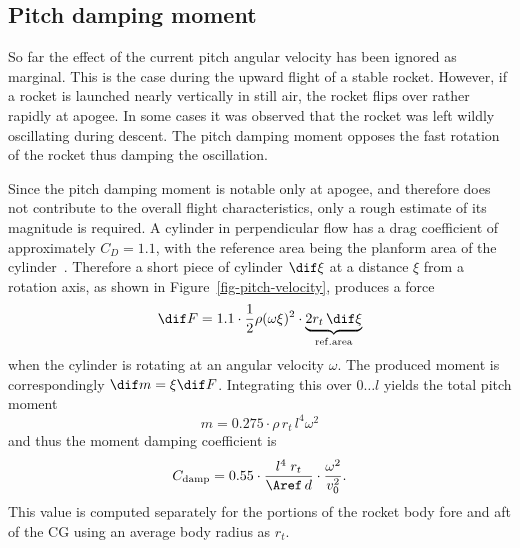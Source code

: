 



\pagebreak[4]
\subsection{Pitch damping moment}

So far the effect of the current pitch angular velocity has been
ignored as marginal.  This is the case during the upward flight of a
stable rocket.  However, if a rocket is launched nearly vertically in
still air, the rocket flips over rather rapidly at apogee.  In
some cases it was observed that the rocket was left wildly oscillating
during descent.  The pitch damping moment opposes the fast rotation of
the rocket thus damping the oscillation.

Since the pitch damping moment is notable only at apogee, and
therefore does not contribute to the overall flight characteristics,
only a rough estimate of its magnitude is required.  A cylinder in
perpendicular flow has a drag coefficient of approximately $C_D=1.1$,
with the reference area being the planform area of the
cylinder~\cite[p.~3-11]{hoerner}.  Therefore a short piece of cylinder
$\dif\xi$ at a distance $\xi$ from a rotation axis, as shown in
Figure~\ref{fig-pitch-velocity}, produces a force
%
\begin{equation}
\dif F = 1.1 \cdot \frac{1}{2}\rho(\omega\xi)^2 \cdot 
\underbrace{2r_t\,\dif\xi}_{\rm ref.area}
\end{equation}
%
when the cylinder is rotating at an angular velocity $\omega$.  The
produced moment is correspondingly $\dif m = \xi\dif F$.  Integrating
this over $0\ldots l$ yields the total pitch moment
%
\begin{equation}
m = 0.275 \cdot \rho\, r_t\, l^4 \omega^2
\end{equation}
%
and thus the moment damping coefficient is
%
\begin{equation}
C_{\rm damp} = 
    0.55 \cdot \frac{l^4\; r_t}{\Aref\, d}\cdot\frac{\omega^2}{v_0^2}.
\end{equation}
%
This value is computed separately for the portions of the rocket body
fore and aft of the CG using an average body radius as $r_t$.

